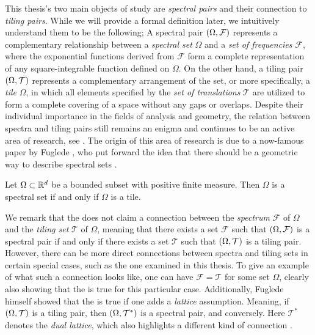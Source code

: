 \documentclass[../thesis.tex]{subfiles}
\begin{document}
This thesis's two main objects of study are \emph{spectral pairs} and their connection to \emph{tiling pairs}. While we will provide a formal definition later, we intuitively understand them to be the following; A spectral pair $(\Omega,\mathcal{F})$ represents a complementary relationship between a \emph{spectral set} $\Omega$ and a \emph{set of frequencies} $\mathcal{F}$, where the exponential functions derived from $\mathcal{F}$ form a complete representation of any square-integrable function defined on $\Omega$. On the other hand, a tiling pair $(\Omega,\mathcal{T})$ represents a complementary arrangement of the set, or more specifically, a \emph{tile} $\Omega$, in which all elements specified by the \emph{set of translations} $\mathcal{T}$ are utilized to form a complete covering of a space without any gaps or overlaps. Despite their individual importance in the fields of analysis and geometry, the relation between spectra and tiling pairs still remains an enigma and continues to be an active area of research, see \cite{levFugledeConjectureConvex2022,kissFugledeConjectureHolds2022}. The origin of this area of research is due to a now-famous paper by Fuglede \cite{fugledeCommutingSelfadjointPartial1974}, who put forward the idea that there should be a geometric way to describe spectral sets \cite{lagariasOrthonormalBasesExponentials2000,liDualityPropertiesSpectra2010}. 

\begin{conjecture}\label{conj:fuglede}  
    Let $\Omega\subset \mathbb{R}^d$ be a bounded subset with positive finite measure. Then $\Omega$ is a spectral set if and only if $\Omega$ is a tile. 
\end{conjecture}

We remark that the  does not claim a connection between the \emph{spectrum} $\mathcal{F}$ of $\Omega$ and the \emph{tiling set} $\mathcal{T}$ of $\Omega$, meaning that there exists a set $\mathcal{F}$ such that $(\Omega,\mathcal{F})$ is a spectral pair if and only if there exists a set $\mathcal{T}$ such that $(\Omega,\mathcal{T})$ is a tiling pair. However, there can be more direct connections between spectra and tiling sets in certain special cases, such as the one examined in this thesis. To give an example of what such a connection looks like, one can have $\mathcal{F}=\mathcal{T}$ for some set $\Omega$, clearly also showing that the  is true for this particular case. Additionally, Fuglede himself showed that the  is true if one adds a \emph{lattice} assumption. Meaning, if $(\Omega,\mathcal{T})$ is a tiling pair, then $(\Omega,\mathcal{T^*})$ is a spectral pair, and conversely. Here $\mathcal{T^*}$ denotes the \emph{dual lattice}, which also highlights a different kind of connection \cite{fugledeCommutingSelfadjointPartial1974}.
\end{document}
